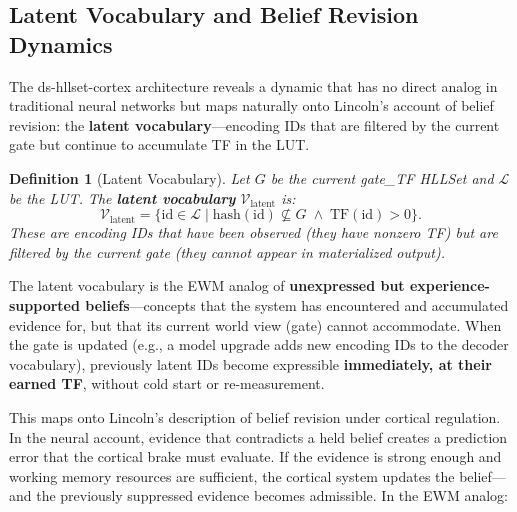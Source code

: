 \documentclass[11pt,a4paper]{article}
\newtheorem{definition}{Definition}[section]
\theoremstyle{remark}
\begin{document}
\subsection{Latent Vocabulary and Belief Revision Dynamics}
\label{sec:cortex-latent}

The ds-hllset-cortex architecture reveals a dynamic that has no direct analog
in traditional neural networks but maps naturally onto Lincoln's account of
belief revision: the \textbf{latent vocabulary}---encoding IDs that are
filtered by the current gate but continue to accumulate TF in the LUT.

\begin{definition}[Latent Vocabulary]
Let $G$ be the current gate\_TF HLLSet and $\mathcal{L}$ be the LUT. The
\textbf{latent vocabulary} $\mathcal{V}_{\text{latent}}$ is:
\begin{equation}
  \mathcal{V}_{\text{latent}} = \{ \text{id} \in \mathcal{L} \mid
  \text{hash}(\text{id}) \not\subseteq G \;\land\;
  \text{TF}(\text{id}) > 0 \}.
\end{equation}
These are encoding IDs that have been observed (they have nonzero TF) but are
filtered by the current gate (they cannot appear in materialized output).
\end{definition}

The latent vocabulary is the EWM analog of \textbf{unexpressed but
experience-supported beliefs}---concepts that the system has encountered and
accumulated evidence for, but that its current world view (gate) cannot
accommodate. When the gate is updated (e.g., a model upgrade adds new encoding
IDs to the decoder vocabulary), previously latent IDs become expressible
\textbf{immediately, at their earned TF}, without cold start or
re-measurement.

This maps onto Lincoln's description of belief revision under cortical
regulation. In the neural account, evidence that contradicts a held belief
creates a prediction error that the cortical brake must evaluate. If the
evidence is strong enough and working memory resources are sufficient, the
cortical system updates the belief---and the previously suppressed evidence
becomes admissible. In the EWM analog:
\end{document}
